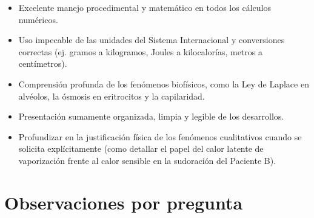\documentclass[11pt,a4paper]{article}
\begin{document}
\vspace{4pt}
\begin{minipage}[t]{0.48\linewidth}
  \begin{tcolorbox}[cajaFortaleza, title={Fortalezas}]
\begin{itemize}[leftmargin=1.5em, itemsep=2pt]
  \item Excelente manejo procedimental y matemático en todos los cálculos numéricos.
  \item Uso impecable de las unidades del Sistema Internacional y conversiones correctas (ej. gramos a kilogramos, Joules a kilocalorías, metros a centímetros).
  \item Comprensión profunda de los fenómenos biofísicos, como la Ley de Laplace en alvéolos, la ósmosis en eritrocitos y la capilaridad.
  \item Presentación sumamente organizada, limpia y legible de los desarrollos.
\end{itemize}
  \end{tcolorbox}
\end{minipage}
\hfill
\begin{minipage}[t]{0.48\linewidth}
  \begin{tcolorbox}[cajaMejora, title={Areas de mejora}]
\begin{itemize}[leftmargin=1.5em, itemsep=2pt]
  \item Profundizar en la justificación física de los fenómenos cualitativos cuando se solicita explícitamente (como detallar el papel del calor latente de vaporización frente al calor sensible en la sudoración del Paciente B).
\end{itemize}
  \end{tcolorbox}
\end{minipage}

\section*{Observaciones por pregunta}
\end{document}
